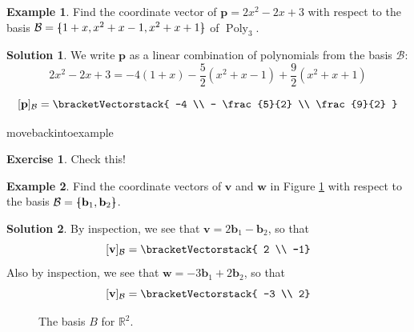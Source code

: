 \documentclass[a4paper,11pt]{book}
\theoremstyle{definition}
\newtheorem{exercise}{Exercise}
\newtheorem{example_environment}{Example}[chapter]
\newtheorem*{solution}{Solution}
\newcommand{\ve}[1]{\mathbf{#1}}
\newcommand{\basis}[1]{{\mathcal #1}}
\newcommand{\cvector}[1]{\bracketVectorstack{#1}}
\newenvironment{example}
	{
		\begin{oframed} 
		\begin{example_environment}
	}
	{
		\end{example_environment}
		\end{oframed}
	}
\newcommand{\bmark}{\raisebox{.53ex}{\rule{.2em}{.1ex}}}
\newcommand{\bopen}{{\protect\ooalign{\{\cr\hfil\bmark\hfil\cr}}}
\newcommand{\bclose}{{\protect\ooalign{\}\cr\hfil\bmark\hfil\cr}}}
\DeclareMathOperator{\Poly}{Poly}
\begin{document}
\begin{example} Find the coordinate vector of $\ve{p} = 2x^2 - 2x + 3$ with respect to the basis $\basis{B} = \bopen 1+x, x^2 + x -1, x^2 + x + 1\bclose$ of $\Poly_3$.
\begin{solution} We write $\ve{p}$ as a linear combination of polynomials from the basis $\basis{B}$:
\[
2x^2 - 2x + 3 = -4(1+x) - \frac{5}{2} (x^2 + x -1) + \frac{9}{2}(x^2 + x +1)
\]

\[ 
 [\ve{p}]_\basis{B} = \cvector{ -4 \\ - \frac{5}{2} \\ \frac{9}{2} }
\]
\end{solution}
\end{example}
movebackintoexample
\begin{exercise} Check this!
\end{exercise}
\begin{example} \label{coord_vectors_finding_example}Find the coordinate vectors of $\ve{v}$ and $\ve{w}$ in Figure \ref{v_and_w_in_basis_B} with respect to the basis $\basis{B} = \bopen \ve{b}_1, \ve{b}_2 \bclose$.

\begin{solution} By inspection, we see that $\ve{v} = 2 \ve{b}_1 - \ve{b}_2$, so that
\[
 [\ve{v}]_\basis{B} = \cvector{ 2 \\ -1}
\]
Also by inspection, we see that $\ve{w} = -3 \ve{b}_1 + 2 \ve{b}_2$, so that
\[
 [\ve{v}]_\basis{B} = \cvector{ -3 \\ 2}
\]
\end{solution}

\end{example}
\begin{figure}
	
\caption{\label{v_and_w_in_basis_B}
The basis $B$ for $\mathbb{R}^2$.}
\end{figure}
\end{document}
